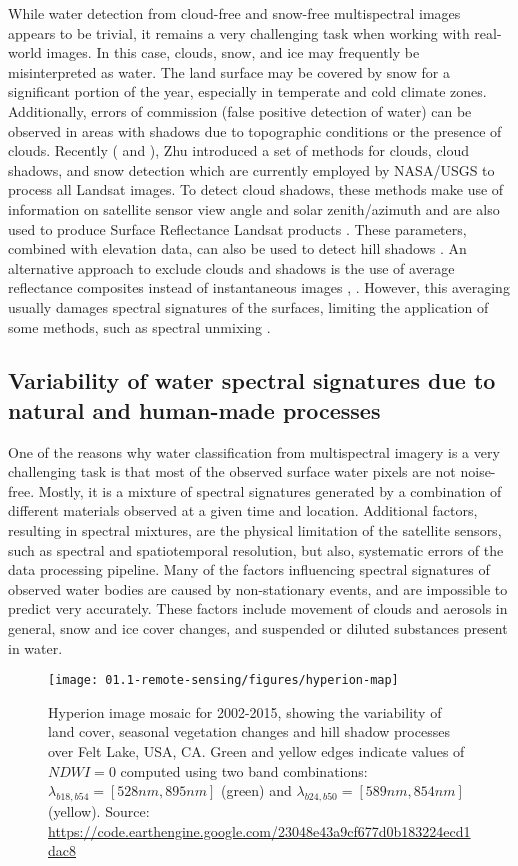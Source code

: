While water detection from cloud-free and snow-free multispectral images appears to be trivial, it remains a very challenging task when working with real-world images. In this case, clouds, snow, and ice may frequently be misinterpreted as water. The land surface may be covered by snow for a significant portion of the year, especially in temperate and cold climate zones. Additionally, errors of commission (false positive detection of water) can be observed in areas with shadows due to topographic conditions or the presence of clouds. Recently (\citep{Zhu2014} and \citep{Zhu2012}), Zhu introduced a set of methods for clouds, cloud shadows, and snow detection which are currently employed by NASA/USGS to process all Landsat images. To detect cloud shadows, these methods make use of information on satellite sensor view angle and solar zenith/azimuth and are also used to produce Surface Reflectance Landsat products \citep{webLandsat}. These parameters, combined with elevation data, can also be used to detect hill shadows \citep{Tan2013}. An alternative approach to exclude clouds and shadows is the use of average reflectance composites instead of instantaneous images \citep{Potapov2012}, \citep{Hansen2013}. However, this averaging usually damages spectral signatures of the surfaces, limiting the application of some methods, such as spectral unmixing \citep{keshava2003survey}.

\subsection{Variability of water spectral signatures due to natural and human-made processes}

One of the reasons why water classification from multispectral imagery is a very challenging task is that most of the observed surface water pixels are not noise-free. Mostly, it is a mixture of spectral signatures generated by a combination of different materials observed at a given time and location. Additional factors, resulting in spectral mixtures, are the physical limitation of the satellite sensors, such as spectral and spatiotemporal resolution, but also, systematic errors of the data processing pipeline. Many of the factors influencing spectral signatures of observed water bodies are caused by non-stationary events, and are impossible to predict very accurately. These factors include movement of clouds and aerosols in general, snow and ice cover changes, and suspended or diluted substances present in water.

\begin{figure}
	\texttt{[image: 01.1-remote-sensing/figures/hyperion-map]}
	\caption{Hyperion image mosaic for 2002-2015, showing the variability of land cover, seasonal vegetation changes and hill shadow processes over Felt Lake, USA, CA. Green and yellow edges indicate values of $NDWI=0$ computed using two band combinations: $\lambda_{b18, b54} = [528nm, 895nm]$ (green) and $\lambda_{b24, b50} = [589nm, 854nm]$ (yellow).
	Source: \url{https://code.earthengine.google.com/23048e43a9cf677d0b183224ecd1dac8}} 
	\label{fig:intro-hyperion-example}
	
\end{figure}

